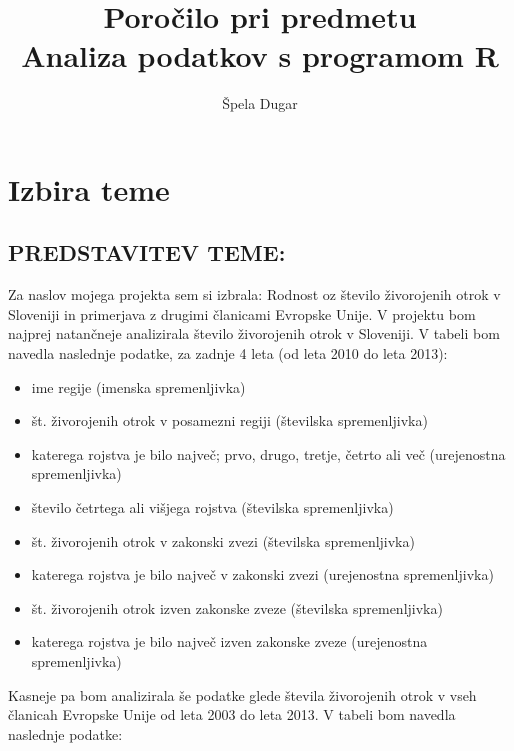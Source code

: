 \documentclass[11pt,a4paper]{article}
\begin{document}
\title{Poročilo pri predmetu \\
Analiza podatkov s programom R}
\author{Špela Dugar}
\maketitle

\section{Izbira teme}

\subsection{PREDSTAVITEV TEME:}
Za naslov mojega projekta sem si izbrala: Rodnost oz število živorojenih otrok v Sloveniji in primerjava z drugimi članicami Evropske Unije.
V projektu bom najprej natančneje analizirala število živorojenih otrok v Sloveniji. V tabeli bom navedla naslednje podatke, za zadnje 4 leta (od leta 2010 do leta 2013):
\begin{itemize}
\item{ime regije (imenska spremenljivka)}
\item{št. živorojenih otrok v posamezni regiji (številska spremenljivka)}
\item{ katerega rojstva je bilo največ; prvo, drugo, tretje, četrto ali več (urejenostna spremenljivka)}
\item{število četrtega ali višjega rojstva (številska spremenljivka)}
\item{št. živorojenih otrok v zakonski zvezi (številska spremenljivka)}
\item{katerega rojstva je bilo največ v zakonski zvezi (urejenostna spremenljivka)}
\item{št. živorojenih otrok izven zakonske zveze (številska spremenljivka)}
\item{katerega rojstva je bilo največ izven zakonske zveze (urejenostna spremenljivka)}
\end{itemize}
Kasneje pa bom analizirala še podatke glede števila živorojenih otrok v vseh članicah Evropske Unije od leta 2003 do leta 2013. V tabeli bom navedla naslednje podatke:
\end{document}
